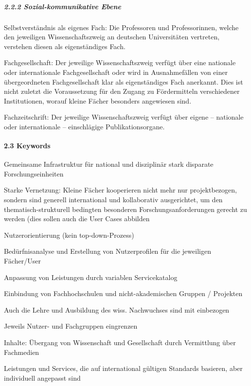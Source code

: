 \hypertarget{sozial-kommunikative-ebene-1}{%
\subparagraph{2.2.2 Sozial-kommunikative
Ebene}\label{sozial-kommunikative-ebene-1}}

Selbstverständnis als eigenes Fach: Die Professoren und Professorinnen,
welche den jeweiligen Wissenschaftszweig an deutschen Universitäten
vertreten, verstehen diesen als eigenständiges Fach.

Fachgesellschaft: Der jeweilige Wissenschaftszweig verfügt über eine
nationale oder internationale Fachgesellschaft oder wird in
Ausnahmefällen von einer übergeordneten Fachgesellschaft klar als
eigenständiges Fach anerkannt. Dies ist nicht zuletzt die Voraussetzung
für den Zugang zu Fördermitteln verschiedener Institutionen, worauf
kleine Fächer besonders angewiesen sind.

Fachzeitschrift: Der jeweilige Wissenschaftszweig verfügt über eigene --
nationale oder internationale -- einschlägige Publikationsorgane.

\hypertarget{keywords}{%
\paragraph{2.3 Keywords}\label{keywords}}

Gemeinsame Infrastruktur für national und disziplinär stark disparate
Forschungseinheiten

Starke Vernetzung: Kleine Fächer kooperieren nicht mehr nur
projektbezogen, sondern sind generell international und kollaborativ
ausgerichtet, um den thematisch-strukturell bedingten besonderen
Forschungsanforderungen gerecht zu werden (dies sollen auch die User
Cases abbilden

Nutzerorientierung (kein top-down-Prozess)

Bedürfnisanalyse und Erstellung von Nutzerprofilen für die jeweiligen
Fächer/User

Anpassung von Leistungen durch variablen Servicekatalog

Einbindung von Fachhochschulen und nicht-akademischen Gruppen /
Projekten

Auch die Lehre und Ausbildung des wiss. Nachwuchses sind mit einbezogen

Jeweils Nutzer- und Fachgruppen eingrenzen

Inhalte: Übergang von Wissenschaft und Gesellschaft durch Vermittlung
über Fachmedien

Leistungen und Services, die auf international gültigen Standards
basieren, aber individuell angepasst sind

